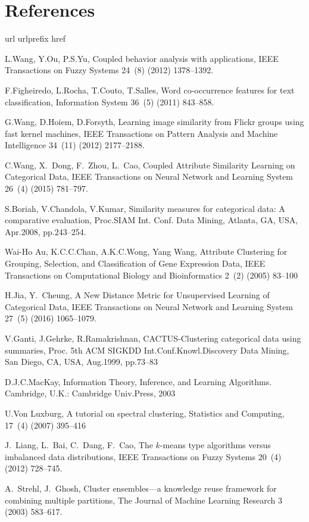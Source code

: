 \documentclass[review]{elsarticle}
\begin{document}
\section*{References}
%
\begin{thebibliography}{10}
\expandafter\ifx\csname url\endcsname\relax
  \def\url#1{\texttt{#1}}\fi
\expandafter\ifx\csname urlprefix\endcsname\relax\def\urlprefix{URL }\fi
\expandafter\ifx\csname href\endcsname\relax
  \def\href#1#2{#2} \def\path#1{#1}\fi

L.Wang, Y.Ou, P.S.Yu, Coupled behavior analysis with applications, IEEE Transactions on Fuzzy Systems 24~(8) (2012) 1378--1392.

F.Figheiredo, L.Rocha, T.Couto, T.Salles, Word co-occurrence features for text classification, Information System 36~(5) (2011) 843--858.

G.Wang, D.Hoiem, D.Forsyth, Learning image similarity from Flickr groups using fast kernel machines, IEEE Transactions on Pattern Analysis and Machine Intelligence 34~(11) (2012) 2177--2188.

C.Wang, X.~Dong, F.~Zhou, L.~Cao, Coupled Attribute Similarity Learning on Categorical Data, IEEE Transactions on Neural Network and Learning System 26~(4) (2015) 781--797.

S.Boriah, V.Chandola, V.Kumar, Similarity measures for categorical data: A comparative evaluation, Proc.SIAM Int. Conf. Data Mining, Atlanta, GA, USA, Apr.2008, pp.243--254.

Wai-Ho Au, K.C.C.Chan, A.K.C.Wong, Yang Wang, Attribute Clustering for Grouping, Selection, and Classification of Gene Expression Data, IEEE Transactions on Computational Biology and Bioinformatics 2~(2) (2005) 83--100

H.Jia, Y.~Cheung, A New Distance Metric for Unsupervised Learning of Categorical Data, IEEE Transactions on Neural Network and Learning System 27~(5) (2016) 1065--1079.

V.Ganti, J.Gehrke, R.Ramakrishnan, CACTUS-Clustering categorical data using summaries, Proc. 5th ACM SIGKDD Int.Conf.Knowl.Discovery Data Mining, San Diego, CA, USA, Aug.1999, pp.73--83

D.J.C.MacKay, Information Theory, Inference, and Learning Algorithms. Cambridge, U.K.: Cambridge Univ.Press, 2003

U.Von Luxburg, A tutorial on spectral clustering, Statistics and Computing, 17~(4) (2007) 395--416

J.~Liang, L.~Bai, C.~Dang, F.~Cao, The $k$-means type algorithms versus imbalanced data distributions, IEEE Transactions on Fuzzy Systems 20~(4) (2012) 728--745.

A.~Strehl, J.~Ghosh, Cluster ensembles---a knowledge reuse framework for combining multiple partitions, The Journal of Machine Learning Research 3 (2003) 583--617.

\end{thebibliography}
\end{document}
